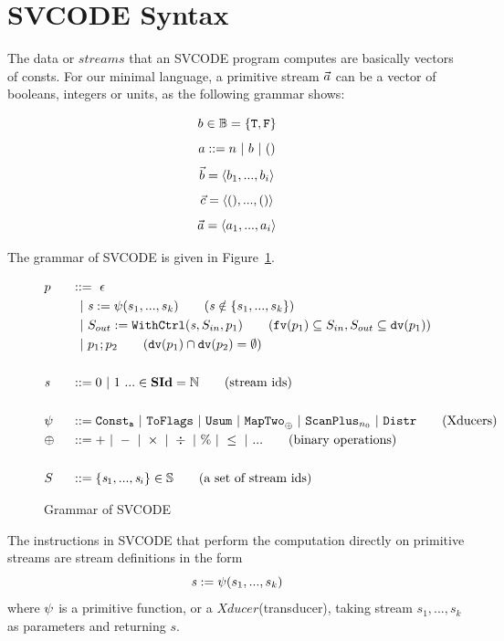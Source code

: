 \section{SVCODE Syntax}
The data or $streams$ that an SVCODE program computes are basically vectors of consts. 
For our minimal language, a primitive stream $\vec a$ can be a vector of booleans, integers or units, as the following grammar shows:

$$b \in \mathbb{B} = \{\mathtt{T},\mathtt{F} \}$$
$$ a ::= n \ | \ b \ | \ ()$$
$$\vec b = \langle b_1,...,b_i \rangle$$ 
$$\vec c = \langle (),...,() \rangle $$
$$\vec a = \langle a_1,...,a_i \rangle  $$ 

\hspace{1cm}

The grammar of SVCODE is given in Figure~\ref{fig-svcode-grammar}.


\begin{figure}[!h] \large
	\begin{alignat*}{2}
	&p  && :: = \ \epsilon \\ 
	&   &&\ \ | \ \sdef{\s}{\psi(s_1,...,s_k)}  \tag{$\s \notin \{s_1,...,s_k\}$}\\
	&   &&\ \ | \ \withctrl{\s}{p_1}{\Sin}{\Sout}  \tag{$ \FV{p_1} \subseteq \Sin, \Sout \subseteq \dv{p_1} $} \\
	&   &&\ \ | \ p_1;p_2  \tag{$\dv{p_1} \cap \dv{p_2} = \emptyset$} \\
	\\
	&\s && ::= 0 \ | \ 1 \ ... \in \SId  = \mathbb{N}   \tag{stream ids}\\
	\\
	& \psi \ && ::= \consta{a} \ | \ \toflag  
	\ | \ \usum \ | \ \maptwo{\oplus} \ | \ \scan_{n_0} \ | \ \distr  \tag{Xducers} \\
	& \oplus \ && :: = + \ | \ - \ | \ \times \ | \ \div \ | \ \% \ | \ \le \ | \ ...  \tag{binary operations}\\
	\\
	&  \S && ::= \{\s_1,..., \s_i\} \in \sset  \tag{a set of stream ids}\\
	\end{alignat*}
\caption{Grammar of SVCODE \label{fig-svcode-grammar}}
\end{figure}

The instructions in SVCODE that perform the computation directly on primitive streams are stream definitions in the form
$$\mathit{s} := \psi(s_1,...,s_k) $$  
where $\psi$ is a primitive function, or a $Xducer$(transducer), taking stream $s_1,...,s_k$ as parameters and returning $s$. 

